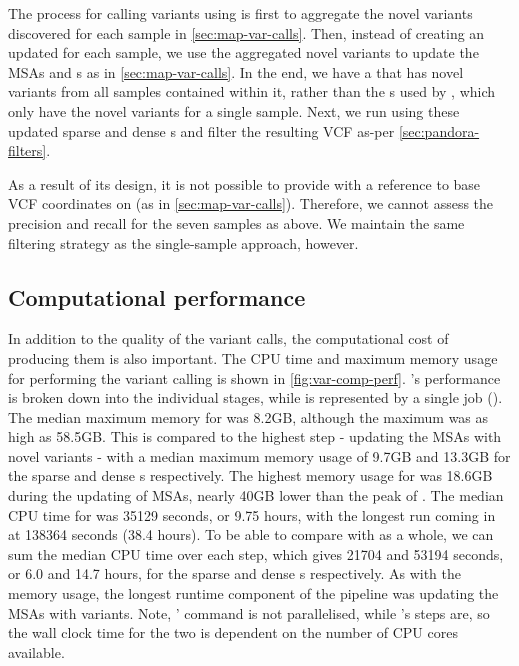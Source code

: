 The process for calling variants using \compare{} is first to aggregate the novel variants discovered for each sample in \autoref{sec:map-var-calls}. Then, instead of creating an updated \prg{} for each sample, we use the aggregated novel variants to update the MSAs and \prg{}s as in \autoref{sec:map-var-calls}. In the end, we have a \prg{} that has novel variants from all samples contained within it, rather than the \prg{}s used by \pandora{} , which only have the novel variants for a single sample. Next, we run  using these updated sparse and dense \prg{}s and filter the resulting VCF as-per \autoref{sec:pandora-filters}.

As a result of its design, it is not possible to provide \compare{} with a reference to base VCF coordinates on (as in \autoref{sec:map-var-calls}). Therefore, we cannot assess the precision and recall for the seven samples as above. We maintain the same filtering strategy as the single-sample approach, however.

\subsection{Computational performance}
\label{sec:var-call-comp-perf}

In addition to the quality of the variant calls, the computational cost of producing them is also important. The CPU time and maximum memory usage for performing the \ont{} variant calling is shown in \autoref{fig:var-comp-perf}. \pandora{}'s performance is broken down into the individual stages, while \bcftools{} is represented by a single job (). The median maximum memory for \bcftools{} was 8.2GB, although the maximum was as high as 58.5GB. This is compared to the highest \pandora{} step - updating the MSAs with novel variants - with a median maximum memory usage of 9.7GB and 13.3GB for the sparse and dense \prg{}s respectively. The highest memory usage for \pandora{} was 18.6GB during the updating of MSAs, nearly 40GB lower than the peak of \bcftools{}. The median CPU time for \bcftools{} was 35129 seconds, or 9.75 hours, with the longest run coming in at 138364 seconds (38.4 hours). To be able to compare \bcftools{} with \pandora{} as a whole, we can sum the median CPU time over each step, which gives 21704 and 53194 seconds, or 6.0 and 14.7 hours, for the sparse and dense \prg{}s respectively. As with the memory usage, the longest runtime component of the \pandora{} pipeline was updating the MSAs with \denovo{} variants. Note, \bcftools{}'  command is not parallelised, while \pandora{}'s steps are, so the wall clock time for the two is dependent on the number of CPU cores available. 

